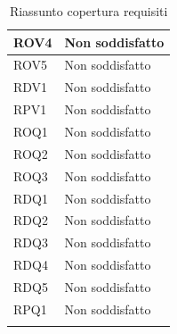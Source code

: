 \begin{longtable}{| p{2.5cm} | p{3cm} |}
	ROV4 & Non soddisfatto \\ \hline
	ROV5 & Non soddisfatto \\ \hline
	RDV1 & Non soddisfatto \\ \hline
	RPV1 & Non soddisfatto \\ \hline
	ROQ1 & Non soddisfatto \\ \hline
	ROQ2 & Non soddisfatto \\ \hline
	ROQ3 & Non soddisfatto \\ \hline
	RDQ1 & Non soddisfatto \\ \hline
	RDQ2 & Non soddisfatto \\ \hline
	RDQ3 & Non soddisfatto \\ \hline
	RDQ4 & Non soddisfatto \\ \hline
	RDQ5 & Non soddisfatto \\ \hline
	RPQ1 & Non soddisfatto \\ \hline
	\caption{Riassunto copertura requisiti}
\end{longtable}


	
